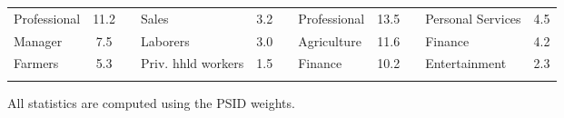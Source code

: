 \begin{center}
\begin{threeparttable}
\begin{tabular}{lcclcclcclc}
                            Professional					& 11.2  &&  Sales	            &	3.2         && Professional	        & 13.5    &&    Personal Services	 & 4.5 \\[1ex]
                            Manager							& 7.5   &&  Laborers	        &	3.0         && Agriculture	        & 11.6    &&    Finance	             & 4.2 \\[1ex]
                            Farmers							& 5.3   &&  Priv. hhld workers  &	1.5         && Finance              & 10.2    &&    Entertainment	     & 2.3 \\
\hline\hline \\[-1ex]
\end{tabular}
\begin{tablenotes}
\item[] All statistics are computed using the PSID weights.
\end{tablenotes}
\label{sum}
\end{threeparttable}
\end{center}

